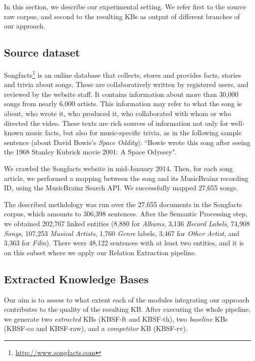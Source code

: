In this section, we describe our experimental setting. We refer first to the source raw corpus, and second to the resulting KBs as output of different branches of our approach.


\subsection{Source dataset}\label{sec:kb:exp:dataset}

Songfacts\footnote{\url{http://www.songfacts.com}} is an online database that collects, stores and provides facts, stories and trivia about songs. These are collaboratively written by registered users, and reviewed by the website staff. It contains information about more than 30,000 songs from nearly 6,000 artists. This information may refer to what the song is about, who wrote it, who produced it, who collaborated with whom or who directed the video. These texts are rich sources of information not only for well-known music facts, but also for music-specific trivia, as in the following sample sentence (about David Bowie's \textit{Space Oddity}): ``Bowie wrote this song after seeing the 1968 Stanley Kubrick movie 2001: A Space Odyssey".

We crawled the Songfacts website in mid-January 2014. Then, for each song article, we performed a mapping between the song and its MusicBrainz recording ID, using the MusicBrainz Search API. We successfully mapped 27,655 songs.

The described methdology was run over the 27,655 documents in the Songfacts corpus, which amounts to 306,398 sentences. After the Semantic Processing step, we obtained 202,767 linked entities (8,880 for \textit{Albums}, 3,136 \textit{Record Labels}, 74,908 \textit{Songs}, 107,253 \textit{Musical Artists}, 1,760 \textit{Genre} labels, 3,467 for \textit{Other Artist}, and 3,363 for \textit{Film}). There were 48,122 sentences with at least two entities, and it is on this subset where we apply our Relation Extraction pipeline.


\subsection{Extracted Knowledge Bases}
\label{sec:kb:exp:learnedkbs}

Our aim is to assess to what extent each of the modules integrating our approach contributes to the quality of the resulting KB. After executing the whole pipeline, we generate two \textit{extracted} KBs (\textsc{KBSF}-ft and \textsc{KBSF}-th), two \textit{baseline} KBs (\textsc{KBSF}-co and \textsc{KBSF}-raw), and a \textit{competitor} KB (\textsc{KBSF}-rv). 

